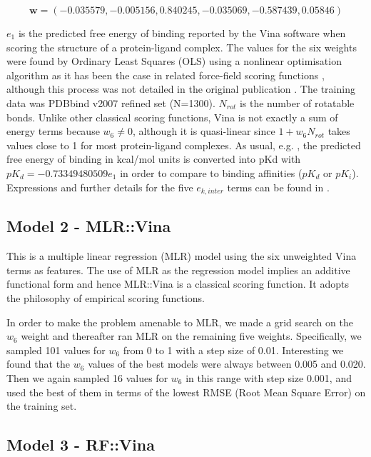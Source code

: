 \begin{equation}
\label{rfscore3:w}
\mathbf w=(-0.035579,-0.005156,0.840245,-0.035069,-0.587439,0.05846)
\end{equation}

$e_1$ is the predicted free energy of binding reported by the Vina software when scoring the structure of a protein-ligand complex. The values for the six weights were found by Ordinary Least Squares (OLS) using a nonlinear optimisation algorithm as it has been the case in related force-field scoring functions \citep{1454}, although this process was not detailed in the original publication \citep{595}. The training data was PDBbind v2007 refined set (N=1300). $N_{rot}$ is the number of rotatable bonds. Unlike other classical scoring functions, Vina is not exactly a sum of energy terms because $w_6\neq0$, although it is quasi-linear since $1+w_6N_{rot}$ takes values close to 1 for most protein-ligand complexes. As usual, e.g. \citep{1362}, the predicted free energy of binding in kcal/mol units is converted into pKd with $pK_d=-0.73349480509e_1$ in order to compare to binding affinities ($pK_d$ or $pK_i$). Expressions and further details for the five $e_{k, inter}$ terms can be found in \citep{595,1362}.

\subsection{Model 2 - MLR::Vina}

This is a multiple linear regression (MLR) model using the six unweighted Vina terms as features. The use of MLR as the regression model implies an additive functional form and hence MLR::Vina is a classical scoring function. It adopts the philosophy of empirical scoring functions.

In order to make the problem amenable to MLR, we made a grid search on the $w_6$ weight and thereafter ran MLR on the remaining five weights. Specifically, we sampled 101 values for $w_6$ from 0 to 1 with a step size of 0.01. Interesting we found that the $w_6$ values of the best models were always between 0.005 and 0.020. Then we again sampled 16 values for $w_6$ in this range with step size 0.001, and used the best of them in terms of the lowest RMSE (Root Mean Square Error) on the training set.

\subsection{Model 3 - RF::Vina}

